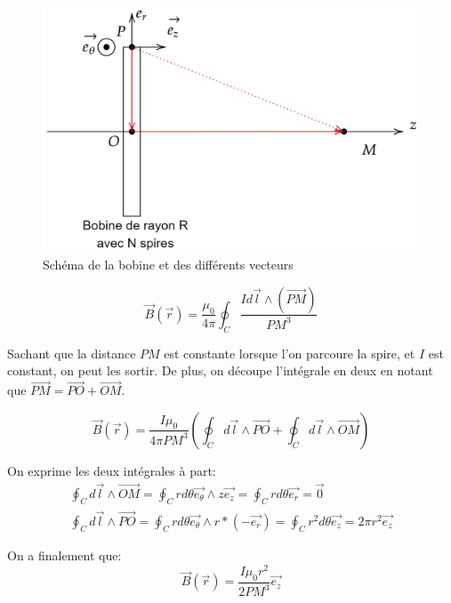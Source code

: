 \documentclass[12pt]{article}
\begin{document}
\begin{figure}[h!]
    \begin{center}
        \includegraphics[scale=0.4]{img/theorie.png}
    \end{center}
    \caption{Schéma de la bobine et des différents vecteurs}
\end{figure}

\begin{equation}
    \vec{B}(\vec{r}) = \frac{\mu_0}{4 \pi} \oint_C \frac{I d\vec{l} \wedge (\vec{PM})}{PM^3}
\end{equation}

Sachant que la distance $PM$ est constante lorsque l'on parcoure la spire, et $I$ est constant, on peut les sortir. De plus,
on découpe l'intégrale en deux en notant que $\vec{PM} = \vec{PO} + \vec{OM}$.

\begin{equation}
    \vec{B}(\vec{r}) = \frac{I \mu_0}{4 \pi PM^3} \left( \oint_C d\vec{l} \wedge \vec{PO} + \oint_C d\vec{l} \wedge \vec{OM} \right)
\end{equation}

On exprime les deux intégrales à part:
\begin{gather*}
    \oint_C d\vec{l} \wedge \vec{OM} = \oint_C rd\theta \vec{e_\theta} \wedge z\vec{e_z} = \oint_C rd\theta \vec{e_r} = \vec{0} \\
    \oint_C d\vec{l} \wedge \vec{PO} = \oint_C rd\theta \vec{e_\theta} \wedge r * (-\vec{e_r}) = \oint_C r^2 d\theta \vec{e_z} = 2 \pi r^2\vec{e_z}
\end{gather*}

On a finalement que:
\begin{equation}
    \vec{B}(\vec{r}) = \frac{I \mu_0 r^2}{2 PM^3} \vec{e_z}
\end{equation}
\end{document}

